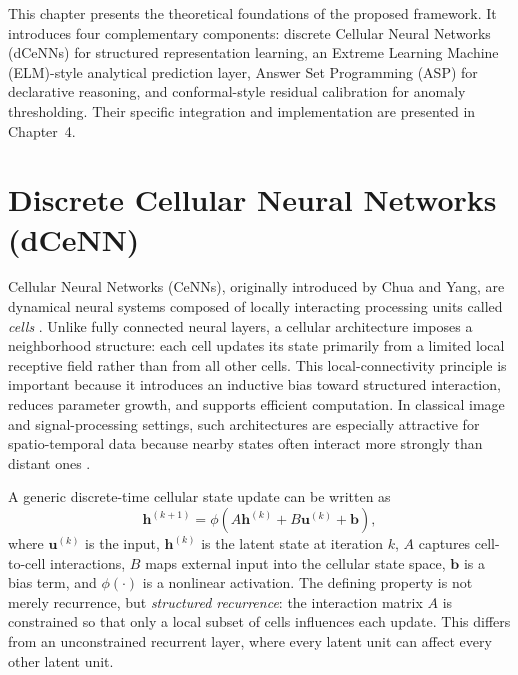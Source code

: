 This chapter presents the theoretical foundations of the proposed framework.
It introduces four complementary components: discrete Cellular Neural Networks
(dCeNNs) for structured representation learning, an Extreme Learning Machine
(ELM)-style analytical prediction layer, Answer Set Programming (ASP) for
declarative reasoning, and conformal-style residual calibration for anomaly
thresholding. Their specific integration and implementation are presented in
Chapter~4.


\section{Discrete Cellular Neural Networks (dCeNN)}

Cellular Neural Networks (CeNNs), originally introduced by Chua and Yang, are dynamical neural systems composed of locally interacting processing units called \emph{cells} \cite{chua1988cellular,chua2002cnnbook}. Unlike fully connected neural layers, a cellular architecture imposes a neighborhood structure: each cell updates its state primarily from a limited local receptive field rather than from all other cells. This local-connectivity principle is important because it introduces an inductive bias toward structured interaction, reduces parameter growth, and supports efficient computation. In classical image and signal-processing settings, such architectures are especially attractive for spatio-temporal data because nearby states often interact more strongly than distant ones \cite{chua2002cnnbook}.

A generic discrete-time cellular state update can be written as
\begin{equation}
\mathbf{h}^{(k+1)} = \phi\!\left( A\mathbf{h}^{(k)} + B\mathbf{u}^{(k)} + \mathbf{b} \right),
\label{eq:dcenn_general}
\end{equation}
where $\mathbf{u}^{(k)}$ is the input, $\mathbf{h}^{(k)}$ is the latent state at iteration $k$, $A$ captures cell-to-cell interactions, $B$ maps external input into the cellular state space, $\mathbf{b}$ is a bias term, and $\phi(\cdot)$ is a nonlinear activation. The defining property is not merely recurrence, but \emph{structured recurrence}: the interaction matrix $A$ is constrained so that only a local subset of cells influences each update. This differs from an unconstrained recurrent layer, where every latent unit can affect every other latent unit.

